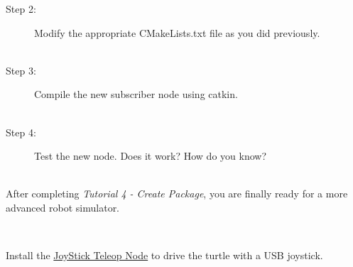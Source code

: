 \documentclass[12pt]{article}
\newcommand{\R}{\color{red}}
\newcommand{\K}{\color{black}}
\newcommand{\G}{\color{mygreen}}
\newcommand{\PR}{\color{mypurple}}
\newcommand{\pkgname}{\G<package\_name>\K}
\newcommand{\wspname}{\R<workspace\_name>\K}
\newcommand{\nodname}{\PR<node\_name>\K}
\newcommand{\home}{\textasciitilde/}
\begin{document}
\begin{description}[labelindent=1cm]
\begin{description}
\begin{lstlisting}
	\end{lstlisting}
	
	
	\item [Step 2:] Modify the appropriate CMakeLists.txt file as you did previously. \\\\
	
	\item [Step 3:] Compile the new subscriber node using catkin. \\\\
	
	
	
	\item [Step 4:] Test the new node. Does it work? How do you know?\\
	
	

	\vspace*{5mm}
	


	\end{description}	
	
	
	

	\item[\textbf{\underline{Tutorial Complete:}}] \hfill \vspace{3mm}\\ After completing {\it Tutorial 4 - Create Package}, you are finally ready for a more advanced robot simulator.
	
	\hfill \vspace{3mm}\\
	
	\item [Bonus Excercise:] Install the \href{http://wiki.ros.org/joy/Tutorials/WritingTeleopNode}{JoyStick Teleop Node} to drive the turtle with a USB joystick.
	
	
	\end{description}
\end{document}
